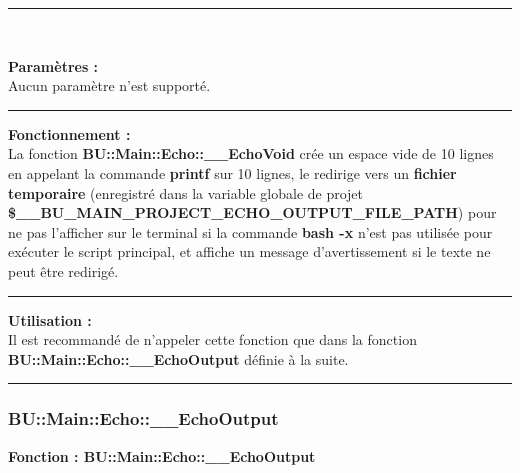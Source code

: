 \documentclass[a4paper,10pt]{article}
\begin{document}

\par\noindent\rule{\textwidth}{0.4pt}\\

\begin{justify}
    \textbf{Paramètres :}\\[1\baselineskip]
    Aucun paramètre n'est supporté.
\end{justify}


\par\noindent\rule{\textwidth}{0.4pt}

\begin{justify}
    \textbf{Fonctionnement :}\\[1\baselineskip]
    La fonction \textbf{\color{func}BU::Main::Echo::\_\_EchoVoid} crée un espace vide de 10 lignes en appelant la commande \textbf{\color{cmds}printf} sur 10 lignes, le redirige vers un \textbf{\color{path}fichier temporaire} (enregistré dans la variable globale de projet \textbf{\color{vars}\$\_\_BU\_MAIN\_PROJECT\_ECHO\_OUTPUT\_FILE\_PATH}) pour ne pas l'afficher sur le terminal si la commande \textbf{\color{cmds}bash -x} n'est pas utilisée pour exécuter le script principal, et affiche un message d'avertissement si le texte ne peut être redirigé.
\end{justify}


\par\noindent\rule{\textwidth}{0.4pt}

\begin{justify}
    \textbf{Utilisation :}\\[1\baselineskip]
    Il est recommandé de n'appeler cette fonction que dans la fonction \textbf{\color{func}BU::Main::Echo::\_\_EchoOutput} définie à la suite.
\end{justify}



\color{sec3}\par\noindent\rule{\textwidth}{0.4pt}\color{text}\setlength{\parskip}{1em}

\color{sec3}
\subsubsection{BU::Main::Echo::\_\_EchoOutput}\color{text}

\begin{justify}
    \textbf{Fonction : \color{func}BU::Main::Echo::\_\_EchoOutput}
\end{justify}
\end{document}

